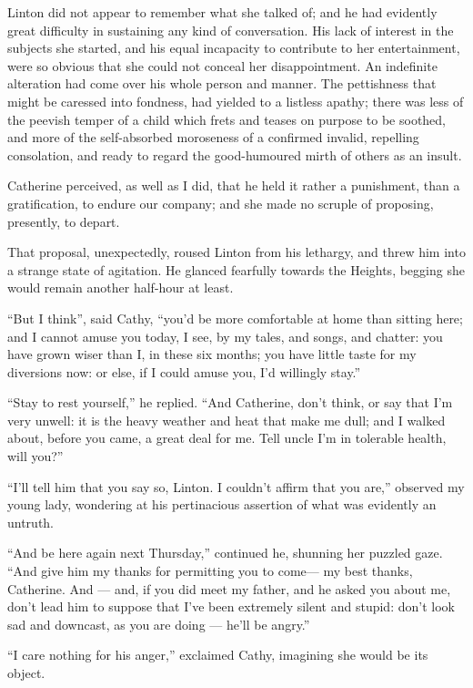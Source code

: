 \par Linton did not appear to remember what she talked of; and he had evidently great difficulty in sustaining any kind of conversation. His lack of interest in the subjects she started, and his equal incapacity to contribute to her entertainment, were so obvious that she could not conceal her disappointment. An indefinite alteration had come over his whole person and manner. The pettishness that might be caressed into fondness, had yielded to a listless apathy; there was less of the peevish temper of a child which frets and teases on purpose to be soothed, and more of the self-absorbed moroseness of a confirmed invalid, repelling consolation, and ready to regard the good-humoured mirth of others as an insult.
\par Catherine perceived, as well as I did, that he held it rather a punishment, than a gratification, to endure our company; and she made no scruple of proposing, presently, to depart.
\par That proposal, unexpectedly, roused Linton from his lethargy, and threw him into a strange state of agitation. He glanced fearfully towards the Heights, begging she would remain another half-hour at least.
\par “But I think”, said Cathy, “you'd be more comfortable at home than sitting here; and I cannot amuse you today, I see, by my tales, and songs, and chatter: you have grown wiser than I, in these six months; you have little taste for my diversions now: or else, if I could amuse you, I'd willingly stay.”
\par “Stay to rest yourself,” he replied. “And Catherine, don't think, or say that I'm very unwell: it is the heavy weather and heat that make me dull; and I walked about, before you came, a great deal for me. Tell uncle I'm in tolerable health, will you?”
\par “I'll tell him that you say so, Linton. I couldn't affirm that you are,” observed my young lady, wondering at his pertinacious assertion of what was evidently an untruth.
\par “And be here again next Thursday,” continued he, shunning her puzzled gaze. “And give him my thanks for permitting you to come— my best thanks, Catherine. And — and, if you did meet my father, and he asked you about me, don't lead him to suppose that I've been extremely silent and stupid: don't look sad and downcast, as you are doing — he'll be angry.”
\par “I care nothing for his anger,” exclaimed Cathy, imagining she would be its object.
